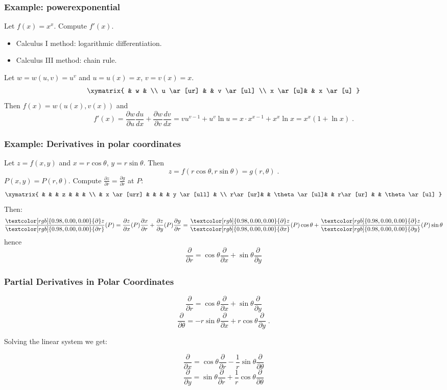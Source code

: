 \begin{frame}
  \frametitle{Example: powerexponential}

   Let $f(x) = x^x$. Compute $f'(x)$.

\begin{itemize}
  \item Calculus I method: logarithmic differentiation.
  \item Calculus III method: chain rule.
\end{itemize}

\pause
Let $w=w(u,v) = u^v$ and $u=u(x) = x$, $v=v(x) = x$.
%
$$
\xymatrix{
 & w  &  \\
u \ar[ur] & &  v \ar[ul] \\
x \ar[u]&  & x \ar[u]
}
$$
\pause
Then $f(x) = w(u(x),v(x))$ and
%
$$f'(x) = \frac{\partial w}{\partial u} \frac{du}{dx} + \frac{\partial w}{\partial v} \frac{dv}{dx} = vu^{v-1} + u^v\ln{u} = x\cdot x^{x-1} + x^x\ln{x} = x^x (1+\ln{x})\; .$$

\end{frame}

\begin{frame}
  \frametitle{Example: Derivatives in polar coordinates}

Let $z=f(x,y)$ and $x=r\cos\theta$, $y=r\sin\theta$. Then
%
$$z=f(r\cos\theta, r\sin\theta) = g(r, \theta) \; .$$
%
$P(x,y) = P(r,\theta)$. Compute $\frac{\partial z}{\partial r} = \frac{\partial g}{\partial r}$ at $P$:
%
$$\xymatrix{
 &   &        & z &    &   & \\
 & x \ar[urr] &        &   &    & y \ar[ull] & \\
r\ar[ur]&   & \theta \ar[ul]&   &  r\ar[ur] &   & \theta \ar[ul]
}$$
%
Then:
%
$$
  \frac{\textcolor[rgb]{0.98,0.00,0.00}{\partial} z}{\textcolor[rgb]{0.98,0.00,0.00}{\partial r}} (P) = \frac{\partial z}{\partial x} (P)\frac{\partial x}{\partial r} + \frac{\partial z}{\partial y}(P) \frac{\partial y}{\partial r} = \frac{\textcolor[rgb]{0.98,0.00,0.00}{\partial} z}{\textcolor[rgb]{0.98,0.00,0.00}{\partial x}}(P) \cos\theta + \frac{\textcolor[rgb]{0.98,0.00,0.00}{\partial} z}{\textcolor[rgb]{0.98,0.00,0.00}{\partial y}} (P) \sin\theta
$$
%
hence
%
$$\frac{\partial}{\partial r} = \cos\theta\frac{\partial }{\partial x}  + \sin\theta\frac{\partial }{\partial y} $$
\end{frame}

\begin{frame}
  \frametitle{Partial Derivatives in Polar Coordinates}
%
$$\frac{\partial}{\partial r} = \cos\theta\frac{\partial }{\partial x}  + \sin\theta\frac{\partial }{\partial y} $$
%
$$  \frac{\partial}{\partial \theta} =  - r \sin\theta\frac{\partial }{\partial x}  + r \cos\theta\frac{\partial }{\partial y} \; .$$

\pause
Solving the linear system we get:

$$
  \frac{\partial}{\partial x} = \cos\theta\frac{\partial }{\partial r}  - \frac{1}{r} \sin\theta\frac{\partial }{\partial \theta} $$
%
$$\frac{\partial}{\partial y} = \sin\theta\frac{\partial }{\partial r}  + \frac{1}{r} \cos\theta\frac{\partial }{\partial \theta}
$$
\end{frame}

